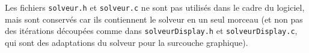 Les fichiers \verb$solveur.h$ et \verb$solveur.c$ ne sont pas utilisés dans le cadre du logiciel, mais sont conservés car ils contiennent le solveur en un seul morceau (et non pas des itérations découpées comme dans \verb$solveurDisplay.h$ et \verb$solveurDisplay.c$, qui sont des adaptations du solveur pour la surcouche graphique).
